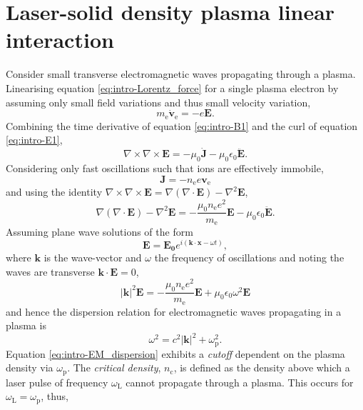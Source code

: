 \section{Laser-solid density plasma linear interaction}\label{sec:intro-lasersolidplasma_linear}
Consider small transverse electromagnetic waves propagating through a plasma. Linearising equation \ref{eq:intro-Lorentz_force} for a single plasma electron by assuming only small field variations and thus small velocity variation,
\begin{equation}\label{eq:intro-EOM_linear}
	m_\mathrm{e}  \dot{\mathbf{v}}_\mathrm{e} = -e\mathbf{E}.
\end{equation}
Combining the time derivative of equation \ref{eq:intro-B1} and the curl of equation \ref{eq:intro-E1},
\begin{equation}
	\nabla\times\nabla \times \mathbf{E}= - \mu_0 \dot{\mathbf{J} }- \mu_0\epsilon_0 \ddot{\mathbf{E}}.
\end{equation}
Considering only fast oscillations such that ions are effectively immobile,
\begin{equation}
	\mathbf{J} = - n_\mathrm{e} e\mathbf{v}_\mathrm{e}
\end{equation}
and using the identity $\nabla\times\nabla \times \mathbf{E} = \nabla(\nabla\cdot \mathbf{E}) - \nabla^2\mathbf{E}$,
\begin{equation}
	\nabla(\nabla\cdot \mathbf{E}) - \nabla^2\mathbf{E} = -\frac{\mu_0 n_\mathrm{e} e^2}{m_\mathrm{e}} \mathbf{E}  - \mu_0 \epsilon_0 \ddot{\mathbf{E}}.
\end{equation} 
Assuming plane wave solutions of the form
\begin{equation}
	\mathbf{E} = \mathbf{E_0}e^{i(\mathbf{k}\cdot \mathbf{x}-\omega t)},
\end{equation}
where $\mathbf{k}$ is the wave-vector and $\omega$ the frequency of oscillations and noting the waves are transverse $\mathbf{k}\cdot \mathbf{E} = 0$,
\begin{equation}
	|\mathbf{k}|^2 \mathbf{E} = -\frac{\mu_0 n_\mathrm{e} e^2}{m_\mathrm{e}}\mathbf{E} + \mu_0\epsilon_0\omega^2\mathbf{E}
\end{equation}
and hence the dispersion relation for electromagnetic waves propagating in a plasma is
\begin{equation}\label{eq:intro-EM_dispersion}
	\omega^2  = c^2|\mathbf{k}|^2  + \omega_\mathrm{p}^2.
\end{equation}
Equation \ref{eq:intro-EM_dispersion} exhibits a \textit{cutoff} dependent on the plasma density via $\omega_\mathrm{p}$. The \textit{critical density}, $n_\mathrm{c}$, is defined as the density above which a laser pulse of frequency $\omega_\mathrm{L}$ cannot propagate through a plasma. This occurs for $\omega_\mathrm{L} = \omega_\mathrm{p}$, thus,
